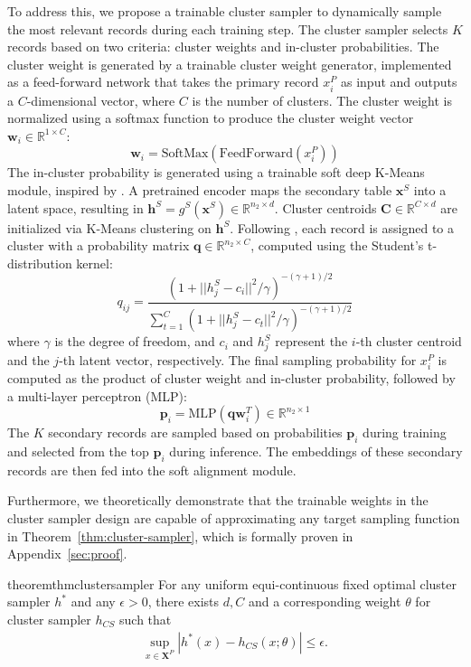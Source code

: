 To address this, we propose a trainable cluster sampler to dynamically sample the most relevant records during each training step. The cluster sampler selects \(K\) records based on two criteria: cluster weights and in-cluster probabilities.
The cluster weight is generated by a trainable cluster weight generator, implemented as a feed-forward network that takes the primary record \(x^P_i\) as input and outputs a \(C\)-dimensional vector, where \(C\) is the number of clusters. The cluster weight is normalized using a softmax function to produce the cluster weight vector \(\mathbf{w}_i \in \mathbb{R}^{1 \times C}\):
\begin{equation}
\mathbf{w}_i = \text{SoftMax}(\text{FeedForward}(x^P_i))
\end{equation}
The in-cluster probability is generated using a trainable soft deep K-Means module, inspired by \citet{xie2016unsupervised,ye2024ptarl}. A pretrained encoder maps the secondary table \(\mathbf{x}^S\) into a latent space, resulting in \(\mathbf{h}^S = g^S(\mathbf{x}^S) \in \mathbb{R}^{n_2 \times d}\). Cluster centroids \(\mathbf{C} \in \mathbb{R}^{C \times d}\) are initialized via K-Means clustering on \(\mathbf{h}^S\). Following \citet{xie2016unsupervised}, each record is assigned to a cluster with a probability matrix \(\mathbf{q} \in \mathbb{R}^{n_2 \times C}\), computed using the Student's t-distribution kernel:
\begin{equation}
    q_{ij} = \frac{(1 + ||h^S_j - c_i||^2/\gamma)^{-(\gamma+1)/2}}{\sum_{t=1}^C (1 + ||h^S_j - c_t||^2/\gamma)^{-(\gamma+1)/2}}
\end{equation}
where \(\gamma\) is the degree of freedom, and \(c_i\) and \(h^S_j\) represent the \(i\)-th cluster centroid and the \(j\)-th latent vector, respectively.
The final sampling probability for \(x^P_i\) is computed as the product of cluster weight and in-cluster probability, followed by a multi-layer perceptron (MLP):
\begin{equation}
    \mathbf{p}_i = \mathrm{MLP}(\mathbf{q} \mathbf{w}_i^T) \in \mathbb{R}^{n_2 \times 1} 
\end{equation}
The \(K\) secondary records are sampled based on probabilities \(\mathbf{p}_i\) during training and selected from the top \(\mathbf{p}_i\) during inference. The embeddings of these secondary records are then fed into the soft alignment module.

Furthermore, we theoretically demonstrate that the trainable weights in the cluster sampler design are capable of approximating any target sampling function in Theorem~\ref{thm:cluster-sampler}, which is formally proven in Appendix~\ref{sec:proof}.
\begin{restatable}{theorem}{thmclustersampler}\label{thm:cluster-sampler}
    For any uniform equi-continuous fixed optimal cluster sampler $h^*$ and any $\epsilon > 0$, there exists $d, C$ 
    and a corresponding weight $\theta$ for cluster sampler $h_{CS}$ such that 
    \begin{align}
        \sup_{x \in \mathbf{X}^P} |h^*(x) - h_{CS}(x; \theta)| \leq \epsilon. 
    \end{align}
\end{restatable}


